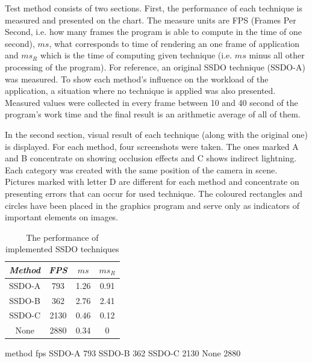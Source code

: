 \documentclass[10pt,journal,compsoc,twoside]{IEEEtran}
\begin{document}
	Test method consists of two sections. First, the performance of each technique is measured and presented on the chart. The measure units are FPS (Frames Per Second, i.e. how many frames the program is able to compute in the time of one second), \(ms\), what corresponds to time of rendering an one frame of application and \(ms_{R}\) which is the time of computing given technique (i.e. \(ms\) minus all other processing of the program). For reference, an original SSDO technique (SSDO-A) was measured. To show each method's influence on the workload of the application, a situation where no technique is applied was also presented. Measured values were collected in every frame between 10 and 40 second of the program's work time and the final result is an arithmetic average of all of them.
	
	In the second section, visual result of each technique (along with the original one) is displayed. For each method, four screenshots were taken. The ones marked A and B concentrate on showing occlusion effects and C shows indirect lightning. Each category was created with the same position of the camera in scene. Pictures marked with letter D are different for each method and concentrate on presenting errors that can occur for used technique. The coloured rectangles and circles have been placed in the graphics program and serve only as indicators of important elements on images.

	\begin{table}[!ht]
		\caption{The performance of implemented SSDO techniques}
		\label{tab:example}
		\centering
		\begin{tabular}{|c|c|c|c|}
			\hline
			\textit{Method} & \textit{FPS} & \(ms\) & \(ms_{R}\) \\ 
			\hline\hline
			SSDO-A & 793 & 1.26 & 0.91 \\ 
			SSDO-B & 362 & 2.76 & 2.41 \\ 
			SSDO-C & 2130 & 0.46 & 0.12 \\ 
			None & 2880 & 0.34 & 0 \\ 
			\hline
		\end{tabular}
	\end{table}
	
	\pgfplotstableread
	{
		method fps
		SSDO-A 793
		SSDO-B 362
		SSDO-C 2130
		None 2880
	}\loadedtable
	
	\datatable
	
\end{document}
